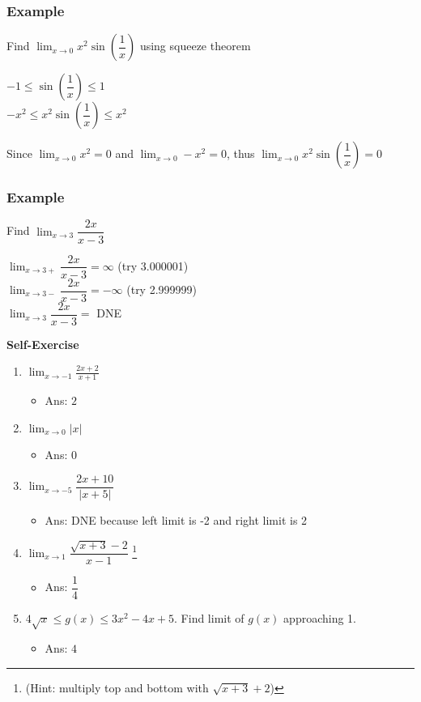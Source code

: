 \documentclass[t]{beamer}
\theoremstyle{plain}
\theoremstyle{definition}
\newcommand{\ds}{\displaystyle}
\newcounter{heading}
\newcommand{\makeheading}[1]{\medskip\begin{large}\noindent\textbf{{#1}}\end{large}\smallskip}
\newcommand{\limm}[1]{\displaystyle \lim_{x\to #1}}
\begin{document}
\frame
{
	\frametitle{Example}
	Find $\limm{0}x^2\sin(\dfrac{1}{x})$ using squeeze theorem
	
	\vspace{2em}
	
    $-1 \leq \sin(\dfrac{1}{x}) \leq 1$\\
	$-x^2 \leq x^2 \sin(\dfrac{1}{x}) \leq x^2$\\
	
	\vspace{2em}
	
	Since $\limm{0}x^2 = 0$ and $\limm{0}-x^2 = 0$, thus $\limm{0}x^2\sin(\dfrac{1}{x}) = 0$

}

\frame
{
	\frametitle{Example}
	Find $\limm{3}\dfrac{2x}{x-3}$
	
	\vspace{2em}
	
    $\limm{3+}\dfrac{2x}{x-3} = \infty$ (try 3.000001)\\
    $\limm{3-}\dfrac{2x}{x-3} = -\infty$ (try 2.999999)\\
    $\limm{3}\dfrac{2x}{x-3} = $ DNE\\

}


\begin{frame}
\makeheading{Self-Exercise}
\footnotesize

\begin{enumerate}

\item $\ds{\lim_{x\to -1}} \ds{\frac{2x+2}{x+1}}$ 
\begin{itemize}
	\item Ans: $2$
\end{itemize}

\item $\limm{0} |x|$ 
\begin{itemize}
	\item Ans: $0$
\end{itemize}

\item  $\limm{-5}\dfrac{2x + 10}{|x + 5|}$
\begin{itemize}
	\item Ans: DNE because left limit is -2 and right limit is 2
\end{itemize}

\item  $\limm{1}\dfrac{\sqrt{x+3}-2}{x-1}$  \footnote{(Hint: multiply top and bottom with $\sqrt{x+3} + 2$)} 
\begin{itemize}
	\item Ans: $\dfrac{1}{4}$
\end{itemize}

\item $4\sqrt{x} \leq g(x) \leq 3x^2 - 4x + 5$.  Find limit of $g(x)$ approaching 1.
\begin{itemize}
	\item Ans: $4$
\end{itemize}

\end{enumerate}

\end{frame}
\end{document}
